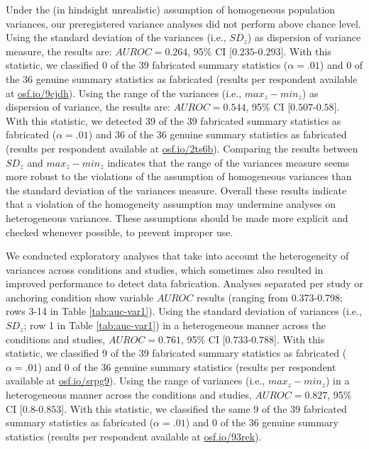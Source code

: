 \documentclass[a5paper]{book}
\begin{document}
Under the (in hindsight unrealistic) assumption of homogeneous
population variances, our preregistered variance analyses did not
perform above chance level. Using the standard deviation of the
variances (i.e., \(SD_z\)) as dispersion of variance measure, the
results are: \(AUROC=0.264\), 95\% CI {[}\(0.235\)-\(0.293\){]}. With
this statistic, we classified 0 of the 39 fabricated summary statistics
(\(\alpha=.01\)) and 0 of the 36 genuine summary statistics as
fabricated (results per respondent available at
\href{https://osf.io/9cjdh}{osf.io/9cjdh}). Using the range of the
variances (i.e., \(max_z-min_z\)) as dispersion of variance, the results
are: \(AUROC=0.544\), 95\% CI {[}\(0.507\)-\(0.58\){]}.\\
With this statistic, we detected 39 of the 39 fabricated summary
statistics as fabricated (\(\alpha=.01\)) and 36 of the 36 genuine
summary statistics as fabricated (results per respondent available at
\href{https://osf.io/2ts6b}{osf.io/2ts6b}). Comparing the results
between \(SD_z\) and \(max_z-min_z\) indicates that the range of the
variances measure seems more robust to the violations of the assumption
of homogeneous variances than the standard deviation of the variances
measure. Overall these results indicate that a violation of the
homogeneity assumption may undermine analyses on heterogeneous
variances. These assumptions should be made more explicit and checked
whenever possible, to prevent improper use.

We conducted exploratory analyses that take into account the
heterogeneity of variances across conditions and studies, which
sometimes also resulted in improved performance to detect data
fabrication. Analyses separated per study or anchoring condition show
variable \(AUROC\) results (ranging from 0.373-0.798; rows 3-14 in Table
\ref{tab:auc-var1}). Using the standard deviation of variances (i.e.,
\(SD_z\); row 1 in Table \ref{tab:auc-var1}) in a heterogeneous manner
across the conditions and studies, \(AUROC=0.761\), 95\% CI
{[}\(0.733\)-\(0.788\){]}. With this statistic, we classified 9 of the
39 fabricated summary statistics as fabricated (\(\alpha=.01\)) and 0 of
the 36 genuine summary statistics (results per respondent available at
\href{https://osf.io/srpg9}{osf.io/srpg9}). Using the range of variances
(i.e., \(max_z-min_z\)) in a heterogeneous manner across the conditions
and studies, \(AUROC=0.827\), 95\% CI {[}\(0.8\)-\(0.853\){]}. With this
statistic, we classified the same 9 of the 39 fabricated summary
statistics as fabricated (\(\alpha=.01\)) and 0 of the 36 genuine
summary statistics (results per respondent available at
\href{https://osf.io/93rek}{osf.io/93rek}).
\end{document}
